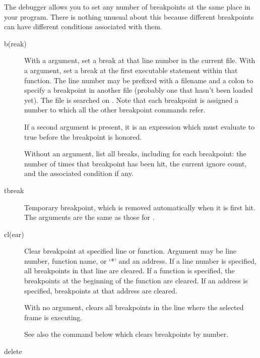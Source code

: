The debugger allows you to set any number of breakpoints at the same
place in your program.  There is nothing unusual about this because
different breakpoints can have different conditions associated with them.

\begin{description}
\item[b(reak) ]

With a  argument, set a break at that line number in the
current file.  With a  argument, set a break at the
first executable statement within that function.  The line number may
be prefixed with a filename and a colon to specify a breakpoint in
another file (probably one that hasn't been loaded yet).  The file is
searched on .  Note that each breakpoint is assigned a
number to which all the other breakpoint commands refer.

If a second argument is present, it is an expression which must
evaluate to true before the breakpoint is honored.

Without an argument, list all breaks, including for each breakpoint:
the number of times that breakpoint has been hit, the current
ignore count, and the associated condition if any.

\item[tbreak ]

Temporary breakpoint, which is removed automatically when it is
first hit.  The arguments are the same as those for .

\item[cl(ear) ]

Clear breakpoint at specified line or function.  Argument may be line
number, function name, or `*' and an address.  If a line number is
specified, all breakpoints in that line are cleared.  If a function is
specified, the breakpoints at the beginning of the function are cleared.  If an
address is specified, breakpoints at that address are cleared.

With no argument, clears all breakpoints in the line where the selected
frame is executing.

See also the  command below which clears breakpoints by
number.

\item[delete ]


\end{description}
